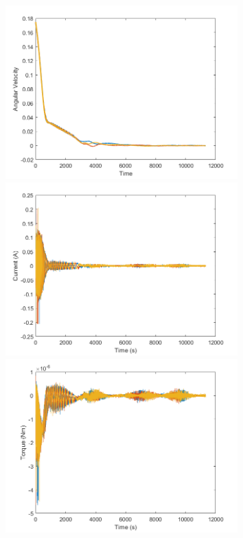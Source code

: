 \documentclass[11pt]{report}
\begin{document}
	\noindent\includegraphics[width=\linewidth,height=190pt]{./images/wVt}
	\includegraphics[width=\linewidth,height=190pt]{./images/currentVt}
	\includegraphics[width=\linewidth,height=190pt]{./images/torqVt}
	
	
\end{document}
